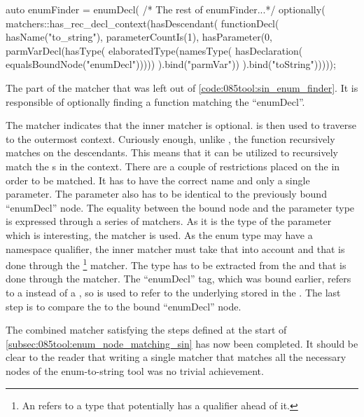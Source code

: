 \begin{listing}[H]
    \begin{cppcode}
auto enumFinder = enumDecl(
  /* The rest of enumFinder...*/
  optionally(
    matchers::has_rec_decl_context(hasDescendant(
      functionDecl(
        hasName("to_string"),
        parameterCountIs(1),
        hasParameter(0,
          parmVarDecl(hasType(
            elaboratedType(namesType(
              hasDeclaration(
                equalsBoundNode("enumDecl")))))
          ).bind("parmVar"))
      ).bind("toString")))));
    \end{cppcode}
    \caption{The part of the  matcher that was left out of \cref{code:085tool:sin_enum_finder}. It is responsible of optionally finding a  function matching the ``enumDecl''.}
    \label{code:085tool:has_enum_to_string}
\end{listing}


The  matcher indicates that the inner matcher is optional.  is then used to traverse to the outermost context.
Curiously enough, unlike , the  function recursively matches on the descendants. This means that it can be utilized to recursively match the s in the context.
There are a couple of restrictions placed on the  in order to be matched. It has to have the correct name and only a single parameter. The parameter also has to be identical to the previously bound ``enumDecl'' node.
The equality between the bound node and the parameter type is expressed through a series of matchers. As it is the type of the parameter which is interesting, the  matcher is used. As the enum type may have a namespace qualifier, the inner matcher must take that into account and that is done through the \footnote{
    An  refers to a type that potentially has a qualifier ahead of it.
} matcher.
The type has to be extracted from the  and that is done through the  matcher.
The ``enumDecl'' tag, which was bound earlier, refers to a  instead of a , so  is used to refer to the underlying  stored in the . The last step is to compare the  to the bound ``enumDecl'' node.

The combined matcher satisfying the steps defined at the start of \cref{subsec:085tool:enum_node_matching_sin} has now been completed.
It should be clear to the reader that writing a single matcher that matches all the necessary nodes of the enum-to-string tool was no trivial achievement.

